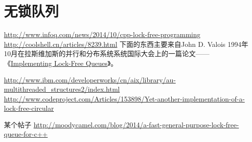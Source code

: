 \section{无锁队列}

\url{http://www.infoq.com/news/2014/10/cpp-lock-free-programming}
\url{http://coolshell.cn/articles/8239.html}
下面的东西主要来自John D. Valois 1994年10月在拉斯维加斯的并行和分布系统系统国际大会上的一篇论文——《\href{http://citeseerx.ist.psu.edu/viewdoc/download?doi=10.1.1.53.8674&rep=rep1&type=pdf}
{Implementing Lock-Free Queues}》。

\url{http://www.ibm.com/developerworks/cn/aix/library/au-multithreaded_structures2/index.html}
\url{http://www.codeproject.com/Articles/153898/Yet-another-implementation-of-a-lock-free-circular}

某个帖子
\url{http://moodycamel.com/blog/2014/a-fast-general-purpose-lock-free-queue-for-c++}



























